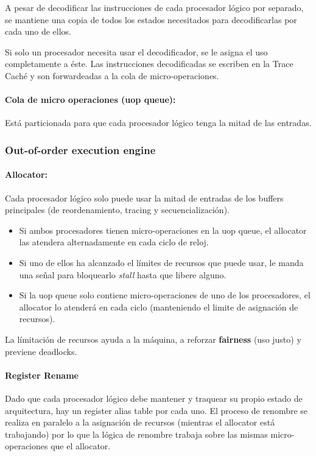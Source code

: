 A pesar de decodificar las instrucciones de cada procesador lógico por separado, se mantiene una copia de todos los estados necesitados para decodificarlas por cada uno de ellos. 

Si solo un procesador necesita usar el decodificador, se le asigna el uso completamente a éste. Las instrucciones decodificadas se escriben en la Trace Caché y son forwardeadas a la cola de micro-operaciones.

\paragraph{Cola de micro operaciones (uop queue):} Está particionada para que cada procesador lógico tenga la mitad de las entradas.

\subsubsection{Out-of-order execution engine}

\paragraph{Allocator:} Cada procesador lógico solo puede usar la mitad de entradas de los buffers principales (de reordenamiento, tracing y secuencialización).

\begin{itemize}
	\item Si ambos procesadores tienen micro-operaciones en la uop queue, el allocator las atendera alternadamente en cada ciclo de reloj.
	\item Si uno de ellos ha alcanzado el límites de recursos que puede usar, le manda una señal para bloquearlo \textit{stall} hasta que libere alguno.
	\item Si la uop queue solo contiene micro-operaciones de uno de los procesadores, el allocator lo atenderá en cada ciclo (manteniendo el limite de asignación de recursos).
\end{itemize}
 
 La límitación de recursos ayuda a la máquina, a reforzar \textbf{fairness} (uso justo) y previene deadlocks. 
 
\paragraph{Register Rename}
Dado que cada procesador lógico debe mantener y traquear su propio estado de arquitectura, hay un register alias table por cada uno. El proceso de renombre se realiza en paralelo a la asignación de recursos (mientras el allocator está trabajando) por lo que la lógica de renombre trabaja sobre las mismas micro-operaciones que el allocator.

